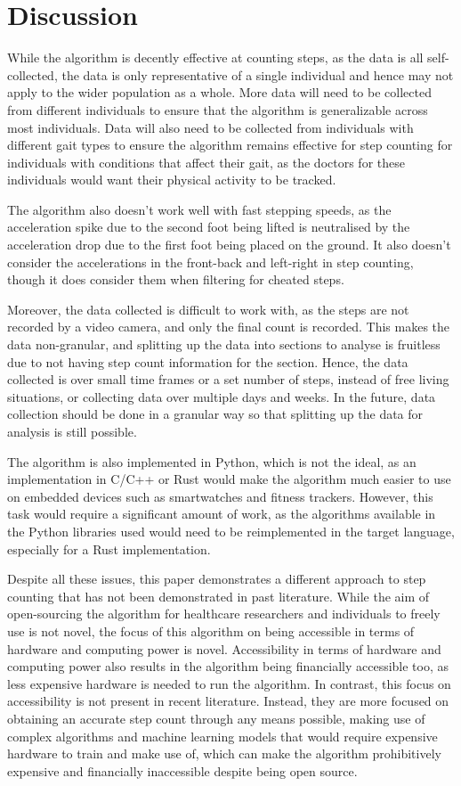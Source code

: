 \documentclass[12pt]{report}
\begin{document}
\section{Discussion}
\label{sec:org0811a04}
While the algorithm is decently effective at counting steps,
as the data is all self-collected, the data is only representative
of a single individual and hence may not apply to the wider
population as a whole. More data will need to be collected from
different individuals to ensure that the algorithm is generalizable
across most individuals. Data will also need to be collected from
individuals with different gait types to ensure the algorithm
remains effective for step counting for individuals with
conditions that affect their gait, as the doctors for
these individuals would want their physical activity to be tracked.

The algorithm also doesn't work well with fast stepping speeds,
as the acceleration spike due to the second foot being lifted
is neutralised by the acceleration drop due to the first foot being
placed on the ground. It also doesn't consider the accelerations
in the front-back and left-right in step counting, though it
does consider them when filtering for cheated steps.

Moreover, the data collected is difficult to work with,
as the steps are not recorded by a video camera, and only the final
count is recorded. This makes the data non-granular, and splitting
up the data into sections to analyse is fruitless due to not having
step count information for the section. Hence, the data collected
is over small time frames or a set number of steps,
instead of free living situations, or collecting data over multiple
days and weeks. In the future, data collection should be done in
a granular way so that splitting up the data for analysis is still
possible.

\clearpage

The algorithm is also implemented in Python, which is not the
ideal, as an implementation in C/C++ or Rust would make the algorithm
much easier to use on embedded devices such as smartwatches
and fitness trackers. However, this task would require a significant
amount of work, as the algorithms available in the Python libraries
used would need to be reimplemented in the target language,
especially for a Rust implementation.

Despite all these issues, this paper demonstrates a different approach
to step counting that has not been demonstrated in past literature.
While the aim of open-sourcing the algorithm for healthcare researchers
and individuals to freely use is not novel, the focus of this algorithm
on being accessible in terms of hardware and computing power is novel.
Accessibility in terms of hardware and computing power also results in
the algorithm being financially accessible too, as less expensive
hardware is needed to run the algorithm.
In contrast, this focus on accessibility is not present in
recent literature. Instead, they are more focused
on obtaining an accurate step count through any means possible,
making use of complex algorithms and machine learning models that
would require expensive hardware to train and make use of,
which can make the algorithm prohibitively expensive and
financially inaccessible despite being open source.
\end{document}
